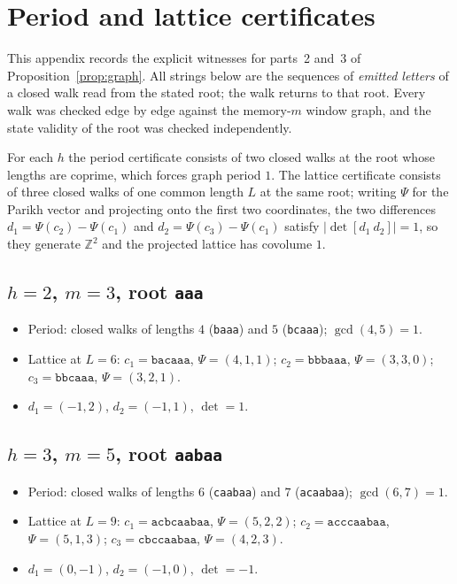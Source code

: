 \section{Period and lattice certificates}
\label{app:A}

This appendix records the explicit witnesses for parts~2 and~3 of
Proposition~\ref{prop:graph}. All strings below are the sequences of
\emph{emitted letters} of a closed walk read from the stated root; the walk
returns to that root. Every walk was checked edge by edge against the
memory-\(m\) window graph, and the state validity of the root was checked
independently.

For each \(h\) the period certificate consists of two closed walks at the root
whose lengths are coprime, which forces graph period \(1\). The lattice
certificate consists of three closed walks of one common length \(L\) at the
same root; writing \(\Psi\) for the Parikh vector and projecting onto the first
two coordinates, the two differences
\(d_1=\Psi(c_2)-\Psi(c_1)\) and \(d_2=\Psi(c_3)-\Psi(c_1)\) satisfy
\(|\det[d_1\ d_2]|=1\), so they generate \(\mathbb Z^2\) and the projected
lattice has covolume \(1\).

\subsection*{\texorpdfstring{\(h=2\)}{h=2}, \texorpdfstring{\(m=3\)}{m=3}, root \texttt{aaa}}
\begin{itemize}
\item Period: closed walks of lengths \(4\) (\texttt{baaa}) and \(5\)
      (\texttt{bcaaa}); \(\gcd(4,5)=1\).
\item Lattice at \(L=6\):
      \(c_1=\texttt{bacaaa}\), \(\Psi=(4,1,1)\);
      \(c_2=\texttt{bbbaaa}\), \(\Psi=(3,3,0)\);
      \(c_3=\texttt{bbcaaa}\), \(\Psi=(3,2,1)\).
\item \(d_1=(-1,2)\), \(d_2=(-1,1)\), \(\det=1\).
\end{itemize}

\subsection*{\texorpdfstring{\(h=3\)}{h=3}, \texorpdfstring{\(m=5\)}{m=5}, root \texttt{aabaa}}
\begin{itemize}
\item Period: closed walks of lengths \(6\) (\texttt{caabaa}) and \(7\)
      (\texttt{acaabaa}); \(\gcd(6,7)=1\).
\item Lattice at \(L=9\):
      \(c_1=\texttt{acbcaabaa}\), \(\Psi=(5,2,2)\);
      \(c_2=\texttt{acccaabaa}\), \(\Psi=(5,1,3)\);
      \(c_3=\texttt{cbccaabaa}\), \(\Psi=(4,2,3)\).
\item \(d_1=(0,-1)\), \(d_2=(-1,0)\), \(\det=-1\).
\end{itemize}

